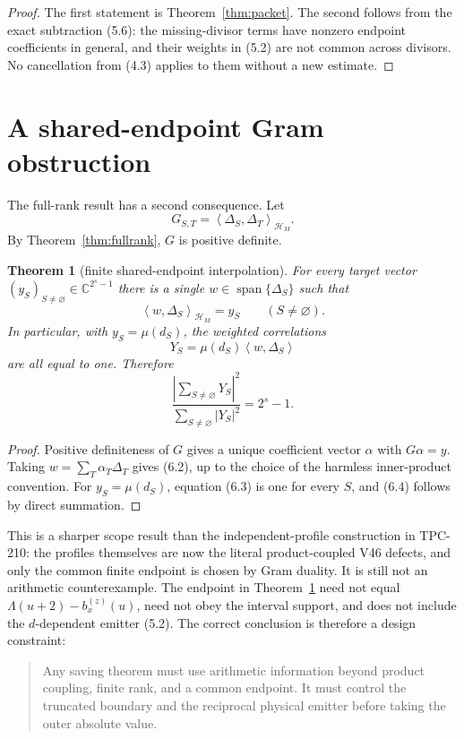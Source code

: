 \documentclass[11pt]{article}
\newtheorem{theorem}{Theorem}[section]
\newcommand{\C}{\mathbb C}
\newcommand{\ip}[2]{\left\langle #1,#2\right\rangle}
\newcommand{\DeltaP}{\Delta}
\newcommand{\muM}{\mu}
\begin{document}
\begin{proof}
The first statement is Theorem~\ref{thm:packet}.  The second follows from
the exact subtraction (5.6): the missing-divisor terms have nonzero endpoint
coefficients in general, and their weights in (5.2) are not common across
divisors.  No cancellation from (4.3) applies to them without a new estimate.
\end{proof}

\section{A shared-endpoint Gram obstruction}

The full-rank result has a second consequence.  Let
\[
 G_{S,T}=\ip{\DeltaP_S}{\DeltaP_T}_{\mathcal H_M}.
 \tag{6.1}
\]
By Theorem~\ref{thm:fullrank}, $G$ is positive definite.

\begin{theorem}[finite shared-endpoint interpolation]
\label{thm:shared}
For every target vector $(y_S)_{S\ne\varnothing}\in\C^{2^s-1}$ there is a
single $w\in\operatorname{span}\{\DeltaP_S\}$ such that
\[
 \ip{w}{\DeltaP_S}_{\mathcal H_M}=y_S
 \qquad(S\ne\varnothing).
 \tag{6.2}
\]
In particular, with $y_S=\muM(d_S)$, the weighted correlations
\[
 Y_S=\muM(d_S)\ip{w}{\DeltaP_S}
 \tag{6.3}
\]
are all equal to one.  Therefore
\[
 \frac{\left|\sum_{S\ne\varnothing}Y_S\right|^2}
 {\sum_{S\ne\varnothing}|Y_S|^2}=2^s-1.
 \tag{6.4}
\]
\end{theorem}

\begin{proof}
Positive definiteness of $G$ gives a unique coefficient vector $\alpha$ with
$G\alpha=y$.  Taking $w=\sum_T\alpha_T\DeltaP_T$ gives (6.2), up to the
choice of the harmless inner-product convention.  For $y_S=\muM(d_S)$,
equation (6.3) is one for every $S$, and (6.4) follows by direct summation.
\end{proof}

This is a sharper scope result than the independent-profile construction in
TPC-210: the profiles themselves are now the literal product-coupled V46
defects, and only the common finite endpoint is chosen by Gram duality.  It is
still not an arithmetic counterexample.  The endpoint in Theorem~\ref{thm:shared}
need not equal $\Lambda(u+2)-b_x^{(z)}(u)$, need not obey the interval support,
and does not include the $d$-dependent emitter (5.2).  The correct conclusion
is therefore a design constraint:
\begin{quote}
Any saving theorem must use arithmetic information beyond product coupling,
finite rank, and a common endpoint.  It must control the truncated boundary
and the reciprocal physical emitter before taking the outer absolute value.
\end{quote}
\end{document}

